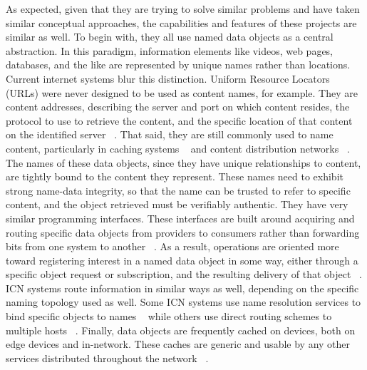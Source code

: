 As expected, given that they are trying to solve similar problems and have taken similar conceptual approaches, the capabilities and features of these projects are similar as well.  To begin with, they all use named data objects as a central abstraction.  In this paradigm, information elements like videos, web pages, databases, and the like are represented by unique names rather than locations.  Current internet systems blur this distinction.  Uniform Resource Locators (URLs) were never designed to be used as content names, for example.  They are content addresses, describing the server and port on which content resides, the protocol to use to retrieve the content, and the specific location of that content on the identified server ~\cite{rfc3986}.  That said, they are still commonly used to name content, particularly in caching systems ~\cite{rfc2616} and content distribution networks ~\cite{Nygren:2010:ANP:1842733.1842736}.  The names of these data objects, since they have unique relationships to content, are tightly bound to the content they represent.  These names need to exhibit strong name-data integrity, so that the name can be trusted to refer to specific content, and the object retrieved must be verifiably authentic.  They have very similar programming interfaces.  These interfaces are built around acquiring and routing specific data objects from providers to consumers rather than forwarding bits from one system to another ~\cite{rfc791,rfc793}.  As a result, operations are oriented more toward registering interest in a named data object in some way, either through a specific object request or subscription, and the resulting delivery of that object ~\cite{6231276}.  ICN systems route information in similar ways as well, depending on the specific naming topology used as well.  Some ICN systems use name resolution services to bind specific objects to names ~\cite{4698847} while others use direct routing schemes to multiple hosts ~\cite{Ghodsi:2011:NCA:2018584.2018586}.  Finally, data objects are frequently cached on devices, both on edge devices and in-network.  These caches are generic and usable by any other services distributed throughout the network ~\cite{6231276}.



		
%
%
	